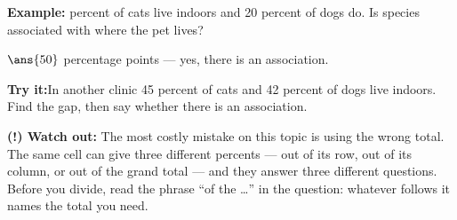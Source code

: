 \documentclass[12pt]{article}
\begin{document}
\begin{examplebox}
\textbf{Example:} percent of cats live indoors and 20 percent of dogs
do. Is species associated with where the pet lives?

$\ans{50}$ percentage points --- yes, there is an association.
\end{examplebox}

\begin{tryitbox}
\textbf{Try it:}\quad In another clinic 45 percent of cats and 42 percent of
dogs live indoors. Find the gap, then say whether there is an
association.\\[2pt]
\end{tryitbox}

\begin{watchoutbox}
\textbf{(!) Watch out:} The most costly mistake on this topic is using the wrong
total. The same cell can give three different percents --- out of its row, out
of its column, or out of the grand total --- and they answer three different
questions. Before you divide, read the phrase ``of the \dots'' in the question:
whatever follows it names the total you need.
\end{watchoutbox}
\end{document}
